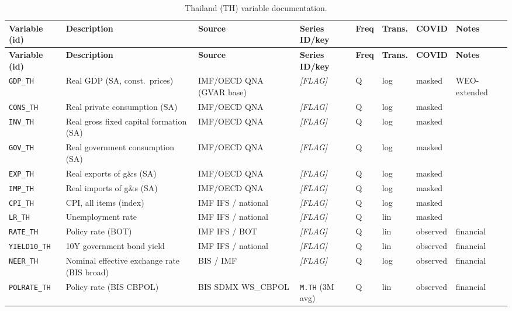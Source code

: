 {\footnotesize
\begin{longtable}{p{2.3cm}p{3.3cm}p{2.1cm}p{2.2cm}p{0.6cm}p{1.4cm}p{1.9cm}p{2.4cm}}
\caption{Thailand (TH) variable documentation.}\label{tab:data:TH}\\
\toprule
\textbf{Variable (id)} & \textbf{Description} & \textbf{Source} & \textbf{Series ID/key} & \textbf{Freq} & \textbf{Trans.} & \textbf{COVID} & \textbf{Notes} \\
\midrule
\endfirsthead
\toprule
\textbf{Variable (id)} & \textbf{Description} & \textbf{Source} & \textbf{Series ID/key} & \textbf{Freq} & \textbf{Trans.} & \textbf{COVID} & \textbf{Notes} \\
\midrule
\endhead
\bottomrule
\endfoot
\texttt{GDP\_TH}    & Real GDP (SA, const.\ prices)      & IMF/OECD QNA (GVAR base) & \textit{[FLAG]} & Q & log & masked & WEO-extended \\
\texttt{CONS\_TH}   & Real private consumption (SA)      & IMF/OECD QNA & \textit{[FLAG]} & Q & log & masked & \\
\texttt{INV\_TH}    & Real gross fixed capital formation (SA) & IMF/OECD QNA & \textit{[FLAG]} & Q & log & masked & \\
\texttt{GOV\_TH}    & Real government consumption (SA)   & IMF/OECD QNA & \textit{[FLAG]} & Q & log & masked & \\
\texttt{EXP\_TH}    & Real exports of g\&s (SA)          & IMF/OECD QNA & \textit{[FLAG]} & Q & log & masked & \\
\texttt{IMP\_TH}    & Real imports of g\&s (SA)          & IMF/OECD QNA & \textit{[FLAG]} & Q & log & masked & \\
\texttt{CPI\_TH}    & CPI, all items (index)             & IMF IFS / national & \textit{[FLAG]} & Q & log & masked & \\
\texttt{LR\_TH}     & Unemployment rate                  & IMF IFS / national & \textit{[FLAG]} & Q & lin & masked & \\
\texttt{RATE\_TH}   & Policy rate (BOT)                  & IMF IFS / BOT & \textit{[FLAG]} & Q & lin & observed & financial \\
\texttt{YIELD10\_TH}& 10Y government bond yield          & IMF IFS / national & \textit{[FLAG]} & Q & lin & observed & financial \\
\texttt{NEER\_TH}   & Nominal effective exchange rate (BIS broad) & BIS / IMF & \textit{[FLAG]} & Q & log & observed & financial \\
\texttt{POLRATE\_TH}& Policy rate (BIS CBPOL)            & BIS SDMX WS\_CBPOL & \texttt{M.TH} (3M avg) & Q & lin & observed & financial \\

\end{longtable}}
